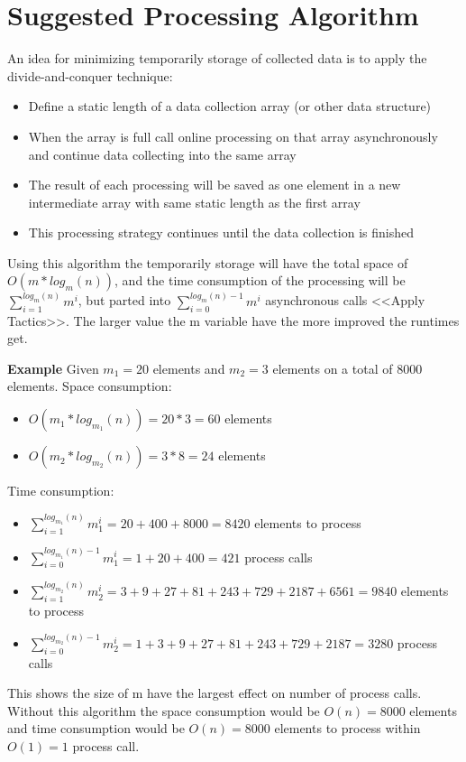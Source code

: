 \section{Suggested Processing Algorithm}
\label{app:processing_algorithm}
An idea for minimizing temporarily storage of collected data is to apply the divide-and-conquer technique:
\begin{itemize}
    \item Define a static length of a data collection array (or other data structure)
    \item When the array is full call online processing on that array asynchronously and continue data collecting into the same array
    \item The result of each processing will be saved as one element in a new intermediate array with same static length as the first array
    \item This processing strategy continues until the data collection is finished
\end{itemize}

Using this algorithm the temporarily storage will have the total space of $O(m*log_m(n))$, and the time consumption of the processing will be $\sum_{i=1}^{log_m(n)}{m^i}$, but parted into $\sum_{i=0}^{log_m(n)-1}{m^i}$ asynchronous calls <<Apply Tactics>>. The larger value the m variable have the more improved the runtimes get.

\textbf{Example}
Given $m_1 = 20$ elements and $m_2 = 3$ elements on a total of 8000 elements.
Space consumption: 
\begin{itemize}
    \item $O(m_1*log_{m_1}(n)) = 20*3 = 60$ elements
    \item $O(m_2*log_{m_2}(n)) = 3*8 = 24$ elements
\end{itemize}

Time consumption:
\begin{itemize}
    \item $\sum_{i=1}^{log_{m_1}(n)}{m_1^i} = 20+400+8000 = 8420$ elements to process
    \item $\sum_{i=0}^{log_{m_1}(n)-1}{m_1^i} = 1+20+400 = 421$ process calls
    \item $\sum_{i=1}^{log_{m_2}(n)}{m_2^i} = 3+9+27+81+243+729+2187+6561 = 9840$ elements to process
    \item $\sum_{i=0}^{log_{m_2}(n)-1}{m_2^i} = 1+3+9+27+81+243+729+2187 = 3280$ process calls
\end{itemize}

This shows the size of m have the largest effect on number of process calls.
Without this algorithm the space consumption would be $O(n) = 8000$ elements and time consumption would be $O(n) = 8000$ elements to process within $O(1) = 1$ process call.